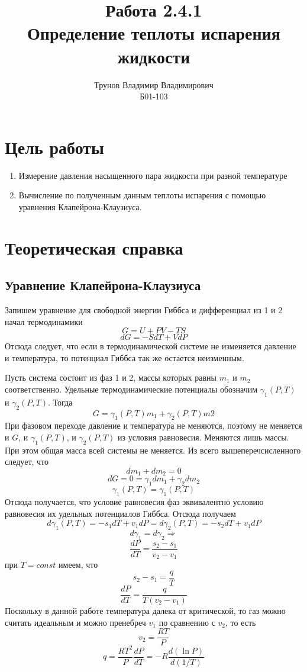 \documentclass[a4paper, 12pt]{article}%
\author{
    Трунов Владимир Владимирович \\
    \vspace*{18 cm}    
    Б01-103}
\title{\textbf{Работа 2.4.1 \\ 
Определение теплоты испарения жидкости}}
\begin{document}
\maketitle
\section*{
    Цель работы}
\begin{enumerate}
\item Измерение давления насыщенного пара жидкости при разной температуре
\item Вычисление по полученным данным теплоты испарения с помощью уравнения Клапейрона-Клаузиуса.
\end{enumerate}
\section*{Теоретическая справка}
\subsection*{Уравнение Клапейрона-Клаузиуса}
Запишем уравнение для свободной энергии Гиббса и дифференциал из 1 и 2 начал термодинамики
\[G = U + PV - TS\]
\[dG = -SdT + VdP\]
Отсюда следует, что если в термодинамической системе не изменяется давление и температура, то потенциал Гиббса так же остается неизменным.

Пусть система состоит из фаз 1 и 2, массы которых равны $m_1$ и $m_2$ соответственно. Удельные термодинамические потенциалы обозначим $\gamma_1 (P, T)$ и $\gamma_2 (P, T)$. Тогда 
\[G = \gamma_1 (P, T) m_1 + \gamma_2 (P, T) m2\]
При фазовом переходе давление и температура не меняются, поэтому не меняется и $G$, и $\gamma_1 (P, T)$, и $\gamma_2 (P, T)$ из условия равновесия. Меняются лишь массы. При этом общая масса всей системы не меняется. Из всего вышеперечсисленного следует, что
\[dm_1 + dm_2 = 0\]
\[dG = 0 = \gamma_1 dm_1 + \gamma_2 dm_2\]
\[\gamma_1 (P, T) = \gamma_1 (P, T)\]
Отсюда получается, что условие равновесия фаз эквивалентно условию равновесия их удельных потенциалов Гиббса. Отсюда получаем
\[d \gamma_1 (P, T) =  -s_1 dT + v_1 dP = d \gamma_2 (P, T) = -s_2 dT + v_1 dP\]
\[d \gamma_1 = d \gamma_2 \Rightarrow\]
\[\dfrac{dP}{dT} = \dfrac{s_2 - s_1}{v_2 - v_1}\]
при $T = const$ имеем, что
\[s_2 - s_1 = \dfrac{q}{T}\]
\[\dfrac{dP}{dT} = \dfrac{q}{T(v_2 - v_1)}\]
Поскольку в данной работе температура далека от критической, то газ можно считать идеальным и можно пренебреч $v_1$ по сравнению с $v_2$, то есть 
\[v_2 = \dfrac{RT}{P}\]
\[q = \dfrac{RT^2}{ P} \dfrac{dP}{dT} = -R \dfrac{d(\ln P)}{d(1/T)}\]
\end{document}
